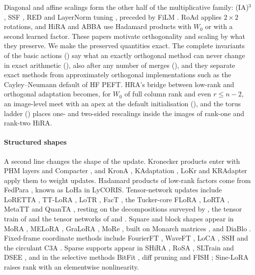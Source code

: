 Diagonal and affine scalings form the other half of the multiplicative family: (IA)$^3$ \citep{liu2022few}, SSF \citep{lian2022scaling}, RED \citep{wu2024advancing} and LayerNorm tuning \citep{zhao2023tuning}, preceded by FiLM \citep{perez2017film}. RoAd \citep{liao20243} applies $2\times2$ rotations, and HiRA \citep{huang2025hira} and ABBA \citep{singhal2025abba} use Hadamard products with $W_0$ or with a second learned factor. These papers motivate orthogonality and scaling by what they preserve. We make the preserved quantities exact. The complete invariants of the basic actions () say what an exactly orthogonal method can never change in exact arithmetic (), also after any number of merges (), and they separate exact methods from approximately orthogonal implementations such as the Cayley--Neumann default of HF PEFT. HRA's bridge between low-rank and orthogonal adaptation becomes, for $W_0$ of full column rank and even $r\le n-2$, an image-level meet with an apex at the default initialisation (), and the torus ladder () places one- and two-sided rescalings inside the images of rank-one and rank-two HiRA.

\paragraph{Structured shapes}
A second line changes the shape of the update. Kronecker products enter with PHM layers \citep{zhang2021beyond} and Compacter \citep{mahabadi2021compacter}, and KronA \citep{edalati2022krona}, KAdaptation \citep{he2022parameter}, LoKr \citep{yeh2023navigating} and KRAdapter \citep{albert2025higher} apply them to weight updates. Hadamard products of low-rank factors come from FedPara \citep{hyeonwoo2021fedpara}, known as LoHa in LyCORIS. Tensor-network updates include LoRETTA \citep{yang2024loretta}, TT-LoRA \citep{anjum2024tensor}, LoTR \citep{bershatsky2024lotr}, FacT \citep{jie2022fact}, the Tucker-core FLoRA \citep{si2024maintaining}, LoRTA \citep{hounie2024lorta}, MetaTT \citep{lopezpiqueres2025metatt} and QuanTA \citep{chen2024quanta}, resting on the decompositions surveyed by \citet{kolda2009tensor}, the tensor train of \citet{oseledets2011tensor} and the tensor networks of \citet{cichocki2016low} and \citet{wang2023tensor}. Square and block shapes appear in MoRA \citep{jiang2024mora}, MELoRA \citep{ren2024melora}, GraLoRA \citep{jung2025gralora}, MoRe \citep{tan2024more}, built on Monarch matrices \citep{dao2022monarch,qiu2024compute}, and DiaBlo \citep{gurses2025diablo}. Fixed-frame coordinate methods include FourierFT \citep{gao2024parameter}, WaveFT \citep{bilican2025exploring}, LoCA \citep{du2025loca}, SSH \citep{shen2025ssh} and the circulant C3A \citep{chen2024parameter}. Sparse supports appear in SHiRA \citep{bhardwaj2024sparse}, RoSA \citep{nikdan2024rosa}, SLTrain \citep{han2024sltrain} and DSEE \citep{chen2021dsee}, and in the selective methods BitFit \citep{benzaken2021bitfit}, diff pruning \citep{guo2020parameter} and FISH \citep{sung2021training}; Sine-LoRA \citep{ji2024efficient} raises rank with an elementwise nonlinearity.

